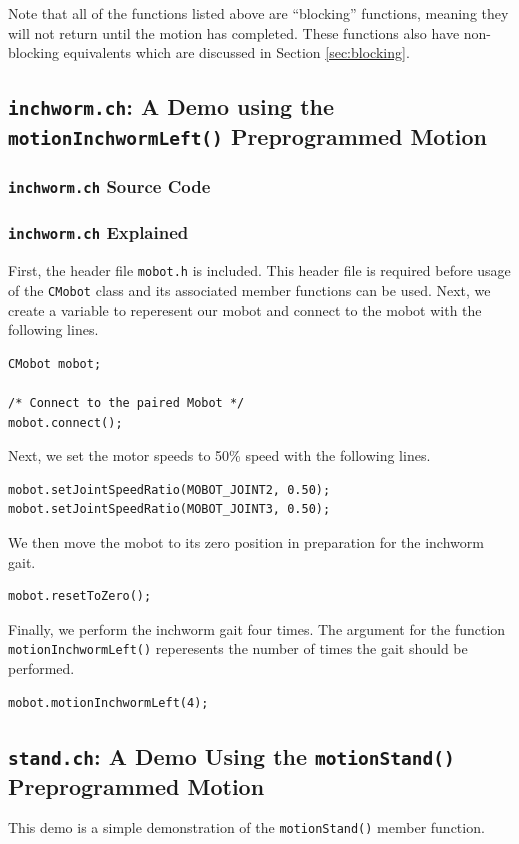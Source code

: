 \documentclass{article}
\begin{document}
Note that all of the functions listed above are ``blocking'' functions, meaning
they will not return until the motion has completed. These functions also
have non-blocking equivalents which are discussed in Section
\ref{sec:blocking}.

\subsection{\texttt{inchworm.ch}: A Demo using the \texttt{motionInchwormLeft()}
Preprogrammed Motion}
\subsubsection{\texttt{inchworm.ch} Source Code}

\subsubsection{\texttt{inchworm.ch} Explained}
First, the header file \texttt{mobot.h} is included. This header file
is required before usage of the \texttt{CMobot} class and its associated
member functions can be used. Next, we create a variable to reperesent our
mobot and connect to the mobot with the following lines.
\begin{verbatim}
CMobot mobot;

/* Connect to the paired Mobot */
mobot.connect();
\end{verbatim}

Next, we set the motor speeds to 50\% speed with the following lines.
\begin{verbatim}
mobot.setJointSpeedRatio(MOBOT_JOINT2, 0.50);
mobot.setJointSpeedRatio(MOBOT_JOINT3, 0.50);
\end{verbatim}

We then move the mobot to its zero position in preparation for the 
inchworm gait.
\begin{verbatim}
mobot.resetToZero();
\end{verbatim}

Finally, we perform the inchworm gait four times. The argument for the
function \texttt{motionInchwormLeft()} reperesents the number of times
the gait should be performed.
\begin{verbatim}
mobot.motionInchwormLeft(4);
\end{verbatim}


\subsection{\texttt{stand.ch}: A Demo Using the \texttt{motionStand()} Preprogrammed
Motion}
This demo is a simple demonstration of the \texttt{motionStand()} member function.
\end{document}
